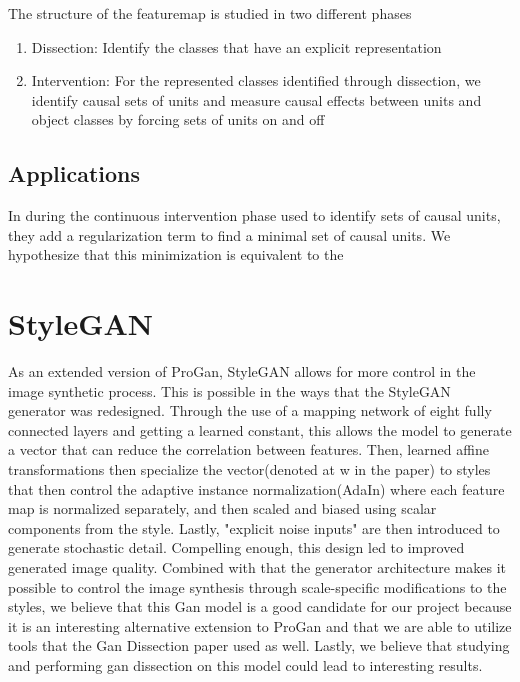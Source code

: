 \documentclass{article}
\begin{document}
The structure of the featuremap is studied in two different phases
\begin{enumerate} 
\item Dissection: Identify the classes that have an explicit representation
\item Intervention: For the represented classes identified through dissection, we identify causal sets of units and measure causal effects between units and object classes by forcing sets of units on and off 
\end{enumerate}

\subsection{Applications}

In \citet{gandissect2019} during the continuous intervention phase used to identify sets of causal units, they add a regularization term to find a minimal set of causal units. We hypothesize that this minimization is equivalent to the 

\section{StyleGAN}

As an extended version of ProGan, StyleGAN allows for more control in the image synthetic process. This is possible in the ways that the StyleGAN generator was redesigned. Through the use of a mapping network of eight fully connected layers and getting a learned constant, this allows the model to generate a vector that can reduce the correlation between features. Then, learned affine transformations then specialize the vector(denoted at w in the paper) to styles that then control the adaptive instance normalization(AdaIn) where each feature map is normalized separately, and then scaled and biased using scalar components from the style. Lastly, "explicit noise inputs" are then introduced to generate stochastic detail. Compelling enough, this design led to improved generated image quality. Combined with that the generator architecture makes it possible to control the image synthesis through scale-specific modifications to the styles, we believe that this Gan model is a good candidate for our project because it is an interesting alternative extension to ProGan and that we are able to utilize tools that the Gan Dissection paper used as well. Lastly, we believe that studying and performing gan dissection on this model could lead to interesting results.
\end{document}
